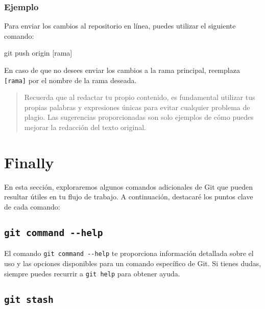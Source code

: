 \documentclass[
  letterpaper,
  DIV=11,
  numbers=noendperiod]{scrartcl}
\newenvironment{Shaded}{}{}
\newcommand{\FunctionTok}[1]{\textcolor[rgb]{0.44,0.26,0.76}{#1}}
\newcommand{\NormalTok}[1]{\textcolor[rgb]{0.14,0.16,0.18}{#1}}
\newcommand{\PreprocessorTok}[1]{\textcolor[rgb]{0.84,0.23,0.29}{#1}}
\newcommand{\SpecialStringTok}[1]{\textcolor[rgb]{0.01,0.18,0.38}{#1}}
\begin{document}
\hypertarget{ejemplo-3}{%
\subsubsection{Ejemplo}\label{ejemplo-3}}

Para enviar los cambios al repositorio en línea, puedes utilizar el
siguiente comando:

\begin{Shaded}
\begin{Highlighting}[]
\FunctionTok{git}\NormalTok{ push origin }\PreprocessorTok{[}\SpecialStringTok{rama}\PreprocessorTok{]}
\end{Highlighting}
\end{Shaded}

En caso de que no desees enviar los cambios a la rama principal,
reemplaza \texttt{{[}rama{]}} por el nombre de la rama deseada.

\begin{quote}
Recuerda que al redactar tu propio contenido, es fundamental utilizar
tus propias palabras y expresiones únicas para evitar cualquier problema
de plagio. Las sugerencias proporcionadas son solo ejemplos de cómo
puedes mejorar la redacción del texto original.
\end{quote}

\hypertarget{finally}{%
\section{Finally}\label{finally}}

En esta sección, exploraremos algunos comandos adicionales de Git que
pueden resultar útiles en tu flujo de trabajo. A continuación, destacaré
los puntos clave de cada comando:

\hypertarget{git-command---help}{%
\subsection{\texorpdfstring{\texttt{git\ command\ -\/-help}}{git command -\/-help}}\label{git-command---help}}

El comando \texttt{git\ command\ -\/-help} te proporciona información
detallada sobre el uso y las opciones disponibles para un comando
específico de Git. Si tienes dudas, siempre puedes recurrir a
\texttt{git\ help} para obtener ayuda.

\hypertarget{git-stash}{%
\subsection{\texorpdfstring{\texttt{git\ stash}}{git stash}}\label{git-stash}}
\end{document}
